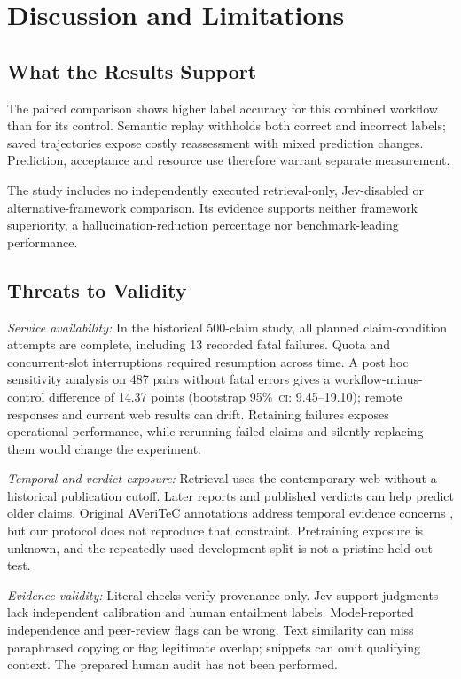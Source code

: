 \documentclass[conference]{IEEEtran}
\newcommand{\CI}{\textsc{ci}}
\newcommand{\pct}{\%}
\begin{document}
\section{Discussion and Limitations}
\subsection{What the Results Support}
The paired comparison shows higher label accuracy for this combined workflow than for its control. Semantic replay withholds both correct and incorrect labels; saved trajectories expose costly reassessment with mixed prediction changes. Prediction, acceptance and resource use therefore warrant separate measurement.

The study includes no independently executed retrieval-only, Jev-disabled or alternative-framework comparison. Its evidence supports neither framework superiority, a hallucination-reduction percentage nor benchmark-leading performance.

\subsection{Threats to Validity}
\textit{Service availability:} In the historical 500-claim study, all planned claim-condition attempts are complete, including 13 recorded fatal failures. Quota and concurrent-slot interruptions required resumption across time. A post hoc sensitivity analysis on 487 pairs without fatal errors gives a workflow-minus-control difference of 14.37 points (bootstrap 95\pct\ \CI: 9.45--19.10); remote responses and current web results can drift. Retaining failures exposes operational performance, while rerunning failed claims and silently replacing them would change the experiment.

\textit{Temporal and verdict exposure:} Retrieval uses the contemporary web without a historical publication cutoff. Later reports and published verdicts can help predict older claims. Original AVeriTeC annotations address temporal evidence concerns \cite{averitec}, but our protocol does not reproduce that constraint. Pretraining exposure is unknown, and the repeatedly used development split is not a pristine held-out test.

\textit{Evidence validity:} Literal checks verify provenance only. Jev support judgments lack independent calibration and human entailment labels. Model-reported independence and peer-review flags can be wrong. Text similarity can miss paraphrased copying or flag legitimate overlap; snippets can omit qualifying context. The prepared human audit has not been performed.
\end{document}
